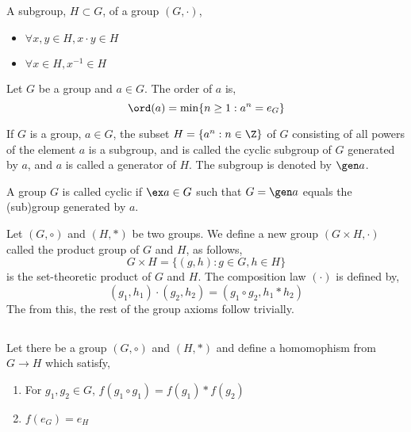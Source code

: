 \documentclass{article}
\begin{document}
\subsection[Subgroups and Orders]{}

\begin{ndefi}[Subgroup]
  A subgroup, $H \subset G$, of a group $(G, \cdot)$,
  \begin{itemize}
    \item $\forall x, y \in H, x \cdot y \in H$
    \item $\forall x \in H, x^{-1} \in H$
  \end{itemize}
\end{ndefi}

\begin{ndefi}
  Let $G$ be a group and $a \in G$. The order of $a$ is,
  $$ \ord (a) = \min \{n \ge 1 : a^n = e_G\} $$
\end{ndefi}

\begin{ndefi}[Generator]
  If $G$ is a group, $a\in G$, the subset $H = \{a^n : n \in \Z\}$ of $G$ consisting of all powers of the element $a$ is a subgroup, and is called the cyclic subgroup of $G$ generated by $a$, and $a$ is called a generator of $H$. The subgroup is denoted by $\gen a$.
\end{ndefi}

\begin{ndefi}
  A group $G$ is called cyclic if $\ex a \in G$ such that $G = \gen a$ equals the (sub)group generated by $a$.
\end{ndefi}

\begin{ndefi}
  Let $(G, \circ)$ and $(H, *)$ be two groups. We define a new group $(G \times H, \cdot)$ called the product group of $G$ and $H$, as follows,
  $$ G \times H = \{(g, h) : g \in G, h \in H\} $$
  is the set-theoretic product of $G$ and $H$. The composition law $(\cdot)$ is defined by,
  $$ (g_1, h_1) \cdot (g_2, h_2) = (g_1 \circ g_2, h_1 * h_2) $$
  The from this, the rest of the group axioms follow trivially.
\end{ndefi}

\subsection[Homomophism]{}

\begin{ndefi}[Homomophism]
  Let there be a group $(G, \circ)$ and $(H, *)$ and define a homomophism from $G \to H$ which satisfy,
  \begin{enumerate}
    \item For $g_1, g_2 \in G$, $f(g_1 \circ g_1) = f(g_1) * f(g_2)$
    \item $f(e_G) = e_H$
  \end{enumerate}
\end{ndefi}
\end{document}
